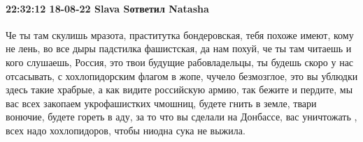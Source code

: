\paragraph{22:32:12 18-08-22 Slava Sответил Natasha}

Че ты там скулишь мразота, праститутка бондеровская, тебя похоже имеют, кому не
лень, во все дыры падстилка фашистская, да нам похуй, че ты там читаешь и кого
слушаешь, Россия, это твои будущие рабовладельцы, ты будешь скоро у нас
отсасывать, с хохлопидорским флагом в жопе, чучело безмозглое, это вы ублюдки
здесь такие храбрые, а как видите российскую армию, так бежите и пердите, мы
вас всех закопаем укрофашистких чмошниц, будете гнить в земле, твари вонючие,
будете гореть в аду, за то что вы сделали на Донбассе, вас уничтожать , всех
надо хохлопидоров, чтобы ниодна сука не выжила.

